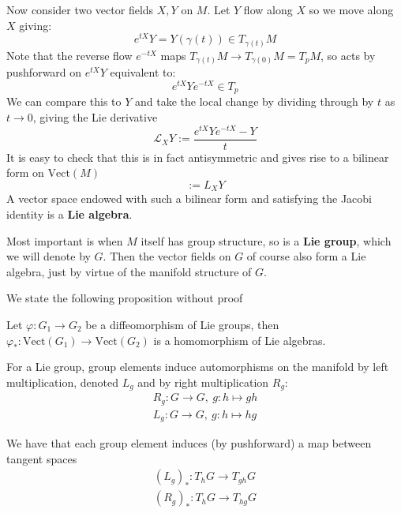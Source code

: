 		Now consider two vector fields $X,Y$ on $M$. Let $Y$ flow along $X$ so we move along $X$ giving:
		\begin{equation}
			e^{tX} Y = Y(\gamma(t)) \in T_{\gamma(t)}M
		\end{equation}
		Note that the reverse flow $e^{-t X}$ maps $T_{\gamma(t)} M \to T_{\gamma(0)}M = T_pM$, so acts by pushforward on $e^{tX} Y$ equivalent to:
		\begin{equation}
			e^{tX} Y e^{-tX} \in T_p
		\end{equation}
		We can compare this to $Y$ and take the local change by dividing through by $t$ as $t \to 0$, giving the Lie derivative
		\begin{equation}
			\mathcal L_X Y := \frac{e^{tX} Y e^{-tX} - Y}{t}
		\end{equation}
		It is easy to check that this is in fact antisymmetric and gives rise to a bilinear form on $\mathrm{Vect}(M)$
		\begin{equation}
			[X,Y]:= L_X Y
		\end{equation}
		A vector space endowed with such a bilinear form and satisfying the Jacobi identity is a \textbf{Lie algebra}.
		
		Most important is when $M$ itself has group structure, so is a \textbf{Lie group}, which we will denote by $G$. Then the vector fields on $G$ of course also form a Lie algebra, just by virtue of the manifold structure of $G$. 
		
		We state the following proposition without proof
		\begin{prop}
			Let $\varphi: G_1 \rightarrow G_2$ be a diffeomorphism of Lie groups, then $\varphi_*: \mathrm{Vect}(G_1) \rightarrow \mathrm{Vect}(G_2)$ is a homomorphism of Lie algebras. 
		\end{prop}
		
		For a Lie group, group elements induce automorphisms on the manifold by left multiplication, denoted $L_g$ and by right multiplication $R_g$:
		\begin{equation}
			\begin{aligned}
				R_g: G \rightarrow G, ~ g: h \mapsto gh\\
				L_g: G \rightarrow G, ~ g: h \mapsto hg
			\end{aligned}
		\end{equation}
		
		 We have that each group element induces (by pushforward) a map between tangent spaces 
		 \begin{equation}
		 	\begin{aligned}
		 		(L_g)_*: T_h G \rightarrow T_{gh} G\\
				(R_g)_*: T_h G \rightarrow T_{hg} G
		 	\end{aligned}
		 \end{equation}
		
